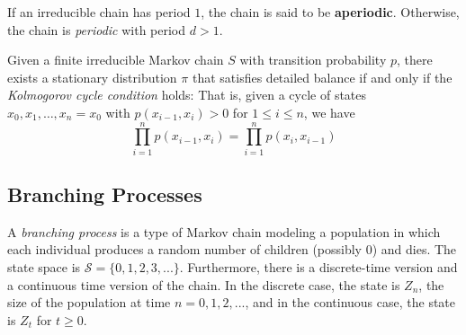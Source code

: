 	\begin{definition}
		\label{def:aperiodic-chain}
		If an irreducible chain has period $1$, the chain is said to be \textbf{aperiodic}. Otherwise, the chain is \textit{periodic} with period $d > 1$. 
	\end{definition}


	\begin{theorem}
		\label{def:kolmogorov-cycle-condition}
		Given a finite irreducible Markov chain $S$ with transition probability $p$, there exists a stationary distribution $\pi$ that satisfies detailed balance if and only if the \textit{Kolmogorov cycle condition} holds: That is, given a cycle of states $x_0, x_1, \ldots, x_n = x_0$ with $p(x_{i-1}, x_i) > 0$ for $1 \leq i \leq n$, we have 
		\begin{equation}
			\prod_{i=1}^n p(x_{i-1}, x_i) = \prod_{i=1}^n p(x_i, x_{i-1})
		\end{equation}
	\end{theorem}

\subsection{Branching Processes}
	
  \begin{definition}
    \label{def:branching-process}
    A \textit{branching process} is a type of Markov chain modeling a population in which each individual produces a random number of children (possibly $0$) and dies. The state space is $\mathcal{S} = \{0, 1, 2, 3, ...\}$. Furthermore, there is a discrete-time version and a continuous time version of the chain. In the discrete case, the state is $Z_n$, the size of the population at time $n = 0, 1, 2, ...$, and in the continuous case, the state is $Z_t$ for $t \geq 0$. 
  \end{definition}

